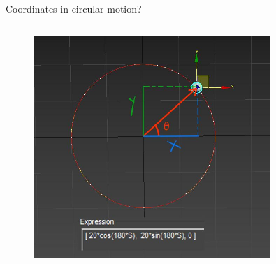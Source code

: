 \documentclass[]{beamer}
\begin{document}
 \begin{frame}

    Coordinates in circular motion?
    
 
        
   
 
           \begin{columns}[c]
             \column{2.3in}  %
  
           
 
             \column{2.5in}
             
       
             \begin{figure}[h!]  
                 \includegraphics[width=0.8\textwidth]{images/34.jpg}
             
               \end{figure}
               
               
               
                
          
             \end{columns}
 
 
 
      
        \end{frame}
\end{document}
